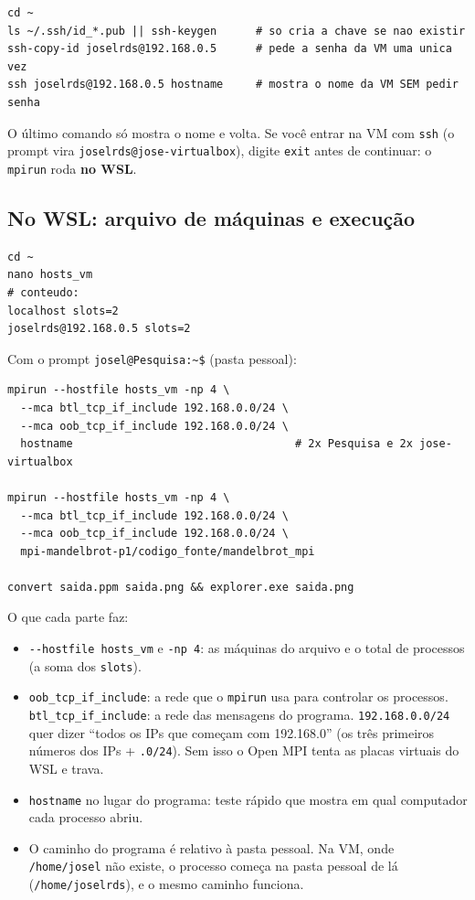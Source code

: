 \documentclass[a4paper,11pt]{article}
\begin{document}
\begin{lstlisting}[style=sh]
cd ~
ls ~/.ssh/id_*.pub || ssh-keygen      # so cria a chave se nao existir
ssh-copy-id joselrds@192.168.0.5      # pede a senha da VM uma unica vez
ssh joselrds@192.168.0.5 hostname     # mostra o nome da VM SEM pedir senha
\end{lstlisting}
O último comando só mostra o nome e volta. Se você entrar na VM com \texttt{ssh} (o prompt vira \texttt{joselrds@jose-virtualbox}), digite \texttt{exit} antes de continuar: o \texttt{mpirun} roda \textbf{no WSL}.

\subsection{No WSL: arquivo de máquinas e execução}

\begin{lstlisting}[style=sh]
cd ~
nano hosts_vm
# conteudo:
localhost slots=2
joselrds@192.168.0.5 slots=2
\end{lstlisting}

Com o prompt \texttt{josel@Pesquisa:\textasciitilde\$} (pasta pessoal):

\begin{lstlisting}[style=sh]
mpirun --hostfile hosts_vm -np 4 \
  --mca btl_tcp_if_include 192.168.0.0/24 \
  --mca oob_tcp_if_include 192.168.0.0/24 \
  hostname                                  # 2x Pesquisa e 2x jose-virtualbox

mpirun --hostfile hosts_vm -np 4 \
  --mca btl_tcp_if_include 192.168.0.0/24 \
  --mca oob_tcp_if_include 192.168.0.0/24 \
  mpi-mandelbrot-p1/codigo_fonte/mandelbrot_mpi

convert saida.ppm saida.png && explorer.exe saida.png
\end{lstlisting}

O que cada parte faz:
\begin{itemize}[leftmargin=*]
  \item \texttt{-{}-hostfile hosts\_vm} e \texttt{-np 4}: as máquinas do arquivo e o total de processos (a soma dos \texttt{slots}).
  \item \texttt{oob\_tcp\_if\_include}: a rede que o \texttt{mpirun} usa para controlar os processos. \texttt{btl\_tcp\_if\_include}: a rede das mensagens do programa. \texttt{192.168.0.0/24} quer dizer ``todos os IPs que começam com 192.168.0'' (os três primeiros números dos IPs + \texttt{.0/24}). Sem isso o Open MPI tenta as placas virtuais do WSL e trava.
  \item \texttt{hostname} no lugar do programa: teste rápido que mostra em qual computador cada processo abriu.
  \item O caminho do programa é relativo à pasta pessoal. Na VM, onde \texttt{/home/josel} não existe, o processo começa na pasta pessoal de lá (\texttt{/home/joselrds}), e o mesmo caminho funciona.
\end{itemize}
\end{document}

